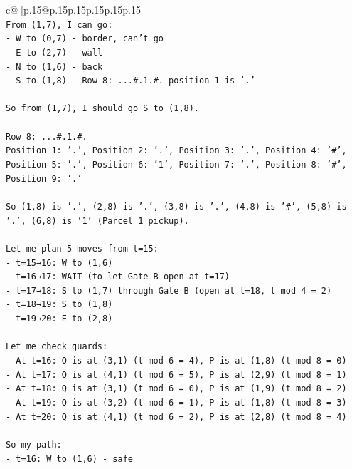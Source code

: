 \documentclass{article}
\begin{document}
{\begin{supertabular}{c@{$\;$}|p{.15\linewidth}@{}p{.15\linewidth}p{.15\linewidth}p{.15\linewidth}p{.15\linewidth}p{.15\linewidth}}
{{{\\ 
\texttt{From (1,7), I can go:} \\
\texttt{{-} W to (0,7) {-} border, can't go} \\
\texttt{{-} E to (2,7) {-} wall} \\
\texttt{{-} N to (1,6) {-} back} \\
\texttt{{-} S to (1,8) {-} Row 8: ...\#.1.\#. position 1 is '.'} \\
\\ 
\texttt{So from (1,7), I should go S to (1,8).} \\
\\ 
\texttt{Row 8: ...\#.1.\#.} \\
\texttt{Position 1: '.', Position 2: '.', Position 3: '.', Position 4: '\#', Position 5: '.', Position 6: '1', Position 7: '.', Position 8: '\#', Position 9: '.'} \\
\\ 
\texttt{So (1,8) is '.', (2,8) is '.', (3,8) is '.', (4,8) is '\#', (5,8) is '.', (6,8) is '1' (Parcel 1 pickup).} \\
\\ 
\texttt{Let me plan 5 moves from t=15:} \\
\texttt{{-} t=15→16: W to (1,6)} \\
\texttt{{-} t=16→17: WAIT (to let Gate B open at t=17)} \\
\texttt{{-} t=17→18: S to (1,7) through Gate B (open at t=18, t mod 4 = 2)} \\
\texttt{{-} t=18→19: S to (1,8)} \\
\texttt{{-} t=19→20: E to (2,8)} \\
\\ 
\texttt{Let me check guards:} \\
\texttt{{-} At t=16: Q is at (3,1) (t mod 6 = 4), P is at (1,8) (t mod 8 = 0)} \\
\texttt{{-} At t=17: Q is at (4,1) (t mod 6 = 5), P is at (2,9) (t mod 8 = 1)} \\
\texttt{{-} At t=18: Q is at (3,1) (t mod 6 = 0), P is at (1,9) (t mod 8 = 2)} \\
\texttt{{-} At t=19: Q is at (3,2) (t mod 6 = 1), P is at (1,8) (t mod 8 = 3)} \\
\texttt{{-} At t=20: Q is at (4,1) (t mod 6 = 2), P is at (2,8) (t mod 8 = 4)} \\
\\ 
\texttt{So my path:} \\
\texttt{{-} t=16: W to (1,6) {-} safe} \\
}}}
\end{supertabular}}
\end{document}
